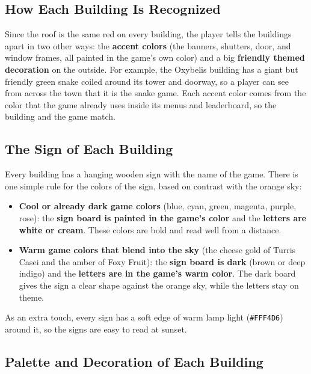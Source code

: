 \documentclass[12pt,letterpaper]{article}
\begin{document}
\subsection{How Each Building Is Recognized}

Since the roof is the same red on every building, the player tells the buildings apart in two other ways: the \textbf{accent colors} (the banners, shutters, door, and window frames, all painted in the game's own color) and a big \textbf{friendly themed decoration} on the outside. For example, the Oxybelis building has a giant but friendly green snake coiled around its tower and doorway, so a player can see from across the town that it is the snake game. Each accent color comes from the color that the game already uses inside its menus and leaderboard, so the building and the game match.

\subsection{The Sign of Each Building}

Every building has a hanging wooden sign with the name of the game. There is one simple rule for the colors of the sign, based on contrast with the orange sky:

\begin{itemize}
  \item \textbf{Cool or already dark game colors} (blue, cyan, green, magenta, purple, rose): the \textbf{sign board is painted in the game's color} and the \textbf{letters are white or cream}. These colors are bold and read well from a distance.
  \item \textbf{Warm game colors that blend into the sky} (the cheese gold of Turris Casei and the amber of Foxy Fruit): the \textbf{sign board is dark} (brown or deep indigo) and the \textbf{letters are in the game's warm color}. The dark board gives the sign a clear shape against the orange sky, while the letters stay on theme.
\end{itemize}

As an extra touch, every sign has a soft edge of warm lamp light (\texttt{\#FFF4D6}) around it, so the signs are easy to read at sunset.

\subsection{Palette and Decoration of Each Building}
\end{document}
